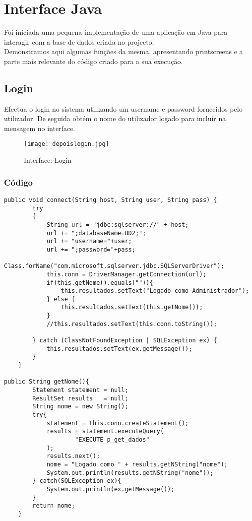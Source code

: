 \chapter{Interface Java}

Foi iniciada uma pequena implementação de uma aplicação em Java para interagir com a base de dados criada no projecto.\\

Demonstramos aqui algumas funções da mesma, apresentando printscreens e a parte mais relevante do código criado para a sua execução.

\section{Login}
Efectua o login no sistema utilizando um username e password fornecidos pelo utilizador.
De seguida obtém o nome do utilizador logado para incluir na mensagem no interface. 

\begin{figure}[!htbp]
\centering
\texttt{[image: depoislogin.jpg]}
\caption{Interface: Login}
\label{fig:interface1}
\end{figure}

\subsection{Código}
\begin{lstlisting}
public void connect(String host, String user, String pass) {
		try
		{
			String url = "jdbc:sqlserver://" + host;
			url += ";databaseName=BD2;";
			url += "username="+user;
			url += ";password="+pass;
			Class.forName("com.microsoft.sqlserver.jdbc.SQLServerDriver");
			this.conn = DriverManager.getConnection(url);
			if(this.getNome().equals("")){
				this.resultados.setText("Logado como Administrador");
			} else {
				this.resultados.setText(this.getNome());
			}
			//this.resultados.setText(this.conn.toString());
			
		} catch (ClassNotFoundException | SQLException ex) {
			this.resultados.setText(ex.getMessage());
		}
	}

public String getNome(){
		Statement statement = null;
		ResultSet results 	= null;
		String nome = new String();
		try{
			statement = this.conn.createStatement();
			results = statement.executeQuery(
					"EXECUTE p_get_dados"
			);
			results.next();
			nome = "Logado como " + results.getNString("nome");
			System.out.println(results.getNString("nome"));
		} catch(SQLException ex){
			System.out.println(ex.getMessage());
		} 
		return nome;
	}
\end{lstlisting}

